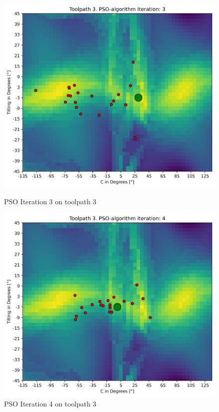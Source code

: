 \begin{figure}[H]	
	\centering
	\begin{minipage}{0.5\textwidth}
		\includegraphics[width=\textwidth]{figures/swarm_true/3_3.png}
		\caption{PSO Iteration 3 on toolpath 3}
		\label{3_true}
	\end{minipage}\hfill
	\begin{minipage}{0.5\textwidth}
		\includegraphics[width=\textwidth]{figures/swarm_true/3_4.png}
		\caption{PSO Iteration 4 on toolpath 3}
		\label{4_true}
	\end{minipage}\par
\end{figure}

